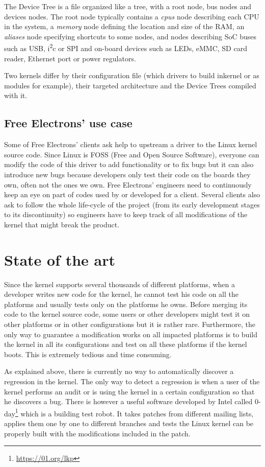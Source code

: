 The Device Tree is a file organized like a tree, with a root node, bus nodes and devices nodes. The root node typically contains a \textit{cpus} node describing each CPU in the system, a \textit{memory} node defining the location and size of the RAM, an \textit{aliases} node specifying shortcuts to some nodes, and nodes describing SoC buses such as USB, i\textsuperscript{2}c or SPI and on-board devices such as LEDs, eMMC, SD card reader, Ethernet port or power regulators.

Two kernels differ by their configuration file (which drivers to build inkernel or as modules for example), their targeted architecture and the Device Trees compiled with it.

\subsection{Free Electrons' use case}
Some of Free Electrons' clients ask help to upstream a driver to the Linux kernel source code. Since Linux is FOSS (Free and Open Source Software), everyone can modify the code of this driver to add functionality or to fix bugs but it can also introduce new bugs because developers only test their code on the boards they own, often not the ones we own. Free Electrons' engineers need to continuously keep an eye on part of codes used by or developed for a client. Several clients also ask to follow the whole life-cycle of the project (from its early development stages to its discontinuity) so engineers have to keep track of all modifications of the kernel that might break the product.

\section{State of the art}
Since the kernel supports several thousands of different platforms, when a developer writes new code for the kernel, he cannot test his code on all the platforms and usually tests only on the platforms he owns. Before merging its code to the kernel source code, some users or other developers might test it on other platforms or in other configurations but it is rather rare. Furthermore, the only way to guarantee a modification works on all impacted platforms is to build the kernel in all its configurations and test on all these platforms if the kernel boots. This is extremely tedious and time consuming.

As explained above, there is currently no way to automatically discover a regression in the kernel. The only way to detect a regression is when a user of the kernel performs an audit or is using the kernel in a certain configuration so that he discovers a bug. There is however a useful software developed by Intel called 0-day\footnote{\url{https://01.org/lkp}} which is a building test robot. It takes patches from different mailing lists, applies them one by one to different branches and tests the Linux kernel can be properly built with the modifications included in the patch.


